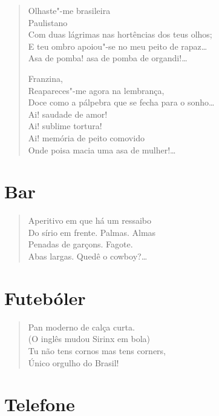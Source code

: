 {\begin{verse}
Olhaste"-me brasileira\\
\quad\quad\quad\quad{}Paulistano\\
Com duas lágrimas nas hortências dos teus olhos;\\
E teu ombro apoiou"-se no meu peito de rapaz\ldots{}\\
Asa de pomba! asa de pomba de organdi!\ldots{}

Franzina,\\
Reapareces"-me agora na lembrança,\\
Doce como a pálpebra que se fecha para o sonho\ldots{}\\
Ai! saudade de amor!\\
Ai! sublime tortura!\\
Ai! memória de peito comovido\\
Onde poisa macia uma asa de mulher!\ldots{}
\end{verse}


\section*{Bar}

\begin{verse}
Aperitivo em que há um ressaibo\\
Do sírio em frente. Palmas. Almas\\
Penadas de garçons. Fagote.\\
Abas largas. Quedê o cowboy?\ldots{}
\end{verse}

\medskip
\section*{Futebóler}

\begin{verse}
Pan moderno de calça curta.\\
(O inglês mudou Sirinx em bola)\\
Tu não tens cornos mas tens corners,\\
Único orgulho do Brasil!
\end{verse}

\medskip
\section*{Telefone}

}
